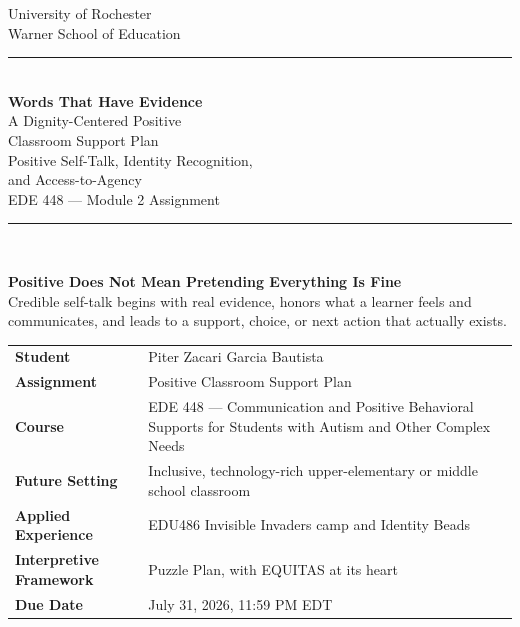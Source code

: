 \documentclass[11pt]{article}
\begin{document}
\hypersetup{pageanchor=false}
\begin{titlepage}
\thispagestyle{empty}

\begin{center}
{\large University of Rochester\\}
{\normalsize Warner School of Education\\[0.15in]}

{\color{PrimaryRed}\rule{\textwidth}{1.4pt}}\\[0.12in]
{\Huge\bfseries Words That Have Evidence}\\[0.15in]
{\huge A Dignity-Centered Positive\\[0.06in]
Classroom Support Plan}\\[0.12in]
{\Large Positive Self-Talk, Identity Recognition,\\[0.04in]
and Access-to-Agency}\\[0.14in]
{\large EDE 448 --- Module 2 Assignment}\\[0.10in]

\vfill

{\color{PrimaryRed}\rule{0.78\textwidth}{0.7pt}}\\[0.18in]

\colorbox{SoftBlue}{%
\parbox{0.88\textwidth}{%
\centering\small\vspace{0.02in}
\textbf{Positive Does Not Mean Pretending Everything Is Fine}\\[0.04in]
Credible self-talk begins with real evidence, honors what a learner feels and communicates, and leads to a support, choice, or next action that actually exists.
}%
}
\end{center}

\vfill

\begin{center}
\renewcommand{\arraystretch}{1.18}
\setlength{\tabcolsep}{4pt}
\begin{tabular}{>{\bfseries\RaggedLeft}p{1.85in} p{5.0in}}
Student & Piter Zacari Garcia Bautista \\
Assignment & Positive Classroom Support Plan \\
Course & EDE 448 --- Communication and Positive Behavioral Supports for Students with Autism and Other Complex Needs \\
Future Setting & Inclusive, technology-rich upper-elementary or middle school classroom \\
Applied Experience & EDU486 Invisible Invaders camp and Identity Beads \\
Interpretive Framework & Puzzle Plan, with EQUITAS at its heart \\
Due Date & July 31, 2026, 11:59 PM EDT \\
\end{tabular}
\end{center}


\end{titlepage}
\end{document}
